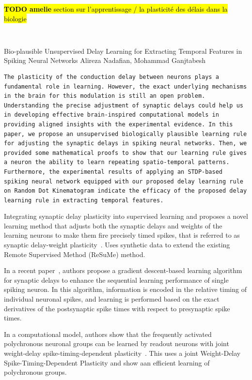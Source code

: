 \documentclass[brainsci, %
               review,submit,pdftex,moreauthors]{Definitions/mdpi}
\newcommand{\note}[1]{{\sethlcolor{yellow}\hl{#1}}}
\begin{document}
\note{\textbf{TODO amelie} section sur l'apprentissage / la plasticité des délais dans la biologie}



~\citep{nadafian_bio-plausible_2020}


Bio-plausible Unsupervised Delay Learning for Extracting Temporal Features in Spiking Neural Networks
Alireza Nadafian, Mohammad Ganjtabesh

\begin{verbatim}
The plasticity of the conduction delay between neurons plays a fundamental role in learning. However, the exact underlying mechanisms in the brain for this modulation is still an open problem. Understanding the precise adjustment of synaptic delays could help us in developing effective brain-inspired computational models in providing aligned insights with the experimental evidence. In this paper, we propose an unsupervised biologically plausible learning rule for adjusting the synaptic delays in spiking neural networks. Then, we provided some mathematical proofs to show that our learning rule gives a neuron the ability to learn repeating spatio-temporal patterns. Furthermore, the experimental results of applying an STDP-based spiking neural network equipped with our proposed delay learning rule on Random Dot Kinematogram indicate the efficacy of the proposed delay learning rule in extracting temporal features.
\end{verbatim}

Integrating synaptic delay plasticity into supervised learning and proposes a novel learning method that adjusts both the synaptic delays and weights of the learning neurons to make them fire precisely timed spikes, that is referred to as synaptic delay-weight plasticity~\citep{zhang_supervised_2020}. Uses synthetic data to extend the existing Remote Supervised Method (ReSuMe) method.

In a recent paper~\citep{luo_supervised_2022}, authors propose a gradient descent-based learning algorithm for synaptic delays to enhance the sequential learning performance of single spiking neuron. In this algorithm, information is encoded in the relative timing of individual neuronal spikes, and learning is performed based on the exact derivatives of the postsynaptic spike times with respect to presynaptic spike times.

In a computational model, authors show that the frequently activated polychronous neuronal groups can be learned by readout neurons with joint weight-delay spike-timing-dependent plasticity~\citep{sun_learning_2016}. This uses a joint Weight-Delay Spike-Timing-Dependent Plasticity and show aan efficient learning of polychronous groups.
\end{document}
